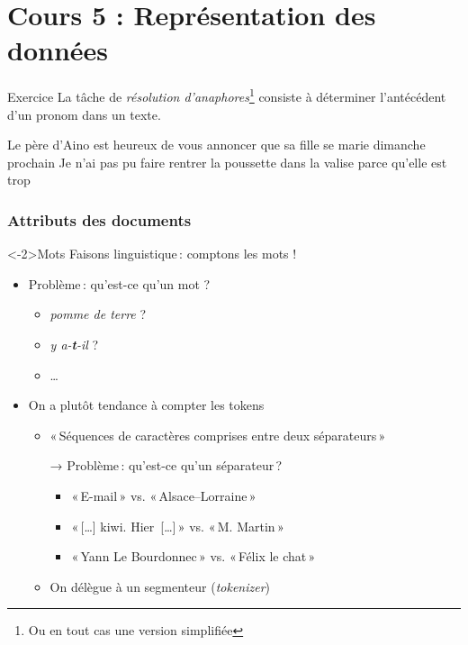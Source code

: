 \documentclass[../allslides.tex]{subfiles}
\renewcommand\titlepagesubtitle{Cours 5 : Représentation des données}
\begin{document}
\part{\titlepagesubtitle{}}

\begin{frame}[plain]
	\partpage %
\end{frame}

\begin{frame}{Exercice}
	La tâche de \emph{résolution d'anaphores}\footnote{Ou en tout cas une version simplifiée} consiste à déterminer l'antécédent d'un pronom dans un texte.
	\vspace{\bigskipamount}

	\begin{overprint}
		 \alert<3>{Le père d'Aino} est heureux de vous annoncer que \alert{sa} fille se marie dimanche prochain
		\onslide<4-> Je n'ai pas pu faire rentrer \alert<5>{la poussette} dans \alert<6->{la valise} parce qu'\alert{elle} est trop \alt<4-5>{grande}{\textbf<6>{petite}}
	\end{overprint}

\end{frame}

\section{Attributs des documents}

\begin{frame}<-2>{Mots}
	Faisons  linguistique : comptons les \alert{mots} !
	\begin{itemize}
		\item Problème : qu'est-ce qu'un mot ?
			\begin{itemize}
				\item \emph{pomme de terre} ?
				\item \emph{y a-\textbf{t}-il} ?
				\item …
			\end{itemize}
		\item On a plutôt tendance à compter les \alert{tokens}
			\begin{itemize}
				\item « Séquences de caractères comprises entre deux séparateurs »
				\item[→] Problème : qu'est-ce qu'un séparateur ? \begin{itemize}
					\item « E-mail » vs. « Alsace–Lorraine »
					\item « […] kiwi. Hier […] » vs. « M. Martin »
					\item « Yann Le Bourdonnec » vs. « Félix le chat »
				\end{itemize}
				\item On délègue à un segmenteur (\emph{tokenizer})
			\end{itemize}
	\end{itemize}
\end{frame}
\end{document}
